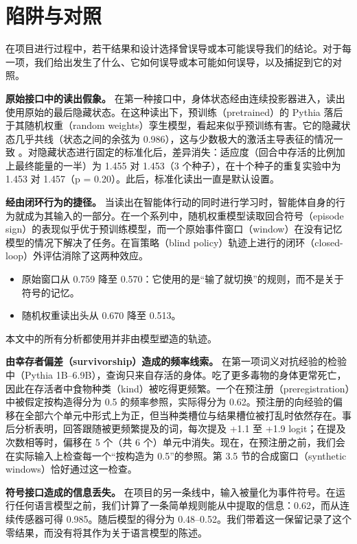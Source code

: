 \documentclass[UTF8,fontset=none,a4paper]{ctexart}
\begin{document}
\section{陷阱与对照}

在项目进行过程中，若干结果和设计选择曾误导或本可能误导我们的结论。对于每一项，我们给出发生了什么、它如何误导或本可能如何误导，以及捕捉到它的对照。

\textbf{原始接口中的读出假象。} 在第一种接口中，身体状态经由连续投影器进入，读出使用原始的最后隐藏状态。在这种读出下，预训练（pretrained）的 Pythia 落后于其随机权重（random weights）孪生模型，看起来似乎预训练有害。它的隐藏状态几乎共线（状态之间的余弦为 0.986），这与少数极大的激活主导表征的情况一致 \citep{sun2024}。对隐藏状态进行固定的标准化后，差异消失：适应度（回合中存活的比例加上最终能量的一半）为 1.455 对 1.453（3 个种子），在十个种子的重复实验中为 1.453 对 1.457（p = 0.20）。此后，标准化读出一直是默认设置。

\textbf{经由闭环行为的捷径。} 当读出在智能体行动的同时进行学习时，智能体自身的行为就成为其输入的一部分。在一个系列中，随机权重模型读取回合符号（episode sign）的表现似乎优于预训练模型，而一个原始事件窗口（window）在没有记忆模型的情况下解决了任务。在盲策略（blind policy）轨迹上进行的闭环（\mbox{closed-loop}）外评估消除了这两种效应。
\begin{itemize}
\item 原始窗口从 0.759 降至 0.570：它使用的是``输了就切换''的规则，而不是关于符号的记忆。
\item 随机权重读出头从 0.670 降至 0.513。
\end{itemize}

本文中的所有分析都使用并非由模型塑造的轨迹。

\textbf{由幸存者偏差（survivorship）造成的频率线索。} 在第一项词义对抗经验的检验中（Pythia \mbox{1B--6.9B}），查询只来自存活的身体。吃了更多毒物的身体更常死亡，因此在存活者中食物种类（kind）被吃得更频繁。一个在预注册（preregistration）中被假定按构造得分为 0.5 的频率参照，实际得分为 0.62。预注册的向经验的偏移在全部六个单元中形式上为正，但当种类槽位与结果槽位被打乱时依然存在。事后分析表明，回答跟随被更频繁提及的词，每次提及 +1.1 至 +1.9 logit；在提及次数相等时，偏移在 5 个（共 6 个）单元中消失。现在，在预注册之前，我们会在实际输入上检查每一个``按构造为 0.5''的参照。第 3.5 节的合成窗口（synthetic windows）恰好通过这一检查。

\textbf{符号接口造成的信息丢失。} 在项目的另一条线中，输入被量化为事件符号。在运行任何语言模型之前，我们计算了一条简单规则能从中提取的信息：0.62，而从连续传感器可得 0.985。随后模型的得分为 \mbox{0.48--0.52}。我们带着这一保留记录了这个零结果，而没有将其作为关于语言模型的陈述。
\end{document}

